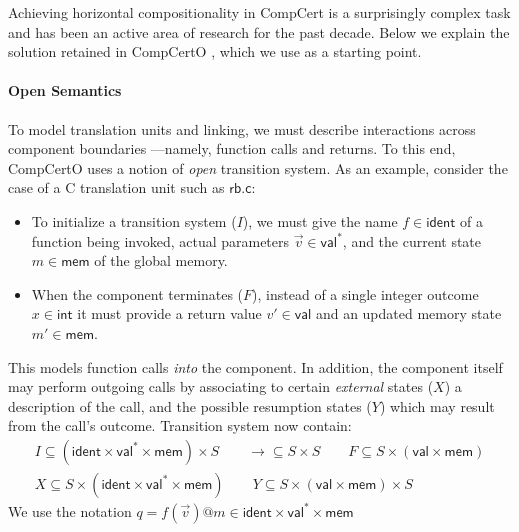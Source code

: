 \documentclass[acmsmall,screen,review,anonymous]{acmart}
\newcommand{\kw}[1]{\ensuremath{ \mathsf{#1} }}
\begin{document}
Achieving horizontal compositionality in CompCert
is a surprisingly complex task and
has been an active area of research for the past decade.
Below we explain the solution retained in CompCertO
\cite{compcerto},
which we use as a starting point.

\paragraph{Open Semantics} %

To model translation units and linking,
we must describe interactions across component boundaries%
---namely, function calls and returns.
To this end,
CompCertO
uses a notion of \emph{open} transition system.
As an example,
consider the case of a C translation unit such as \kw{rb.c}:
\begin{itemize}
\item
To initialize a transition system ($I$),
we must give the name $f \in \kw{ident}$
of a function being invoked,
actual parameters $\vec{v} \in \kw{val}^*$,
and the current state $m \in \kw{mem}$ of the global memory.
\item
When the component terminates ($F$),
instead of a single integer outcome $x \in \kw{int}$ it must provide
a return value $v' \in \kw{val}$ and an updated memory state $m' \in \kw{mem}$.
\end{itemize}
This models function calls \emph{into} the component.
In addition,
the component itself may
perform outgoing calls
by associating to certain \emph{external} states ($X$)
a description of the call,
and the possible resumption states ($Y$)
which may result from the call's outcome.
Transition system now contain:
\begin{equation}
 \begin{array}{c}
  I \subseteq (\kw{ident} \times \kw{val}^* \times \kw{mem}) \times S
  \qquad
  {\rightarrow} \subseteq S \times S
  \qquad
  F \subseteq S \times (\kw{val} \times \kw{mem})
  \\
  X \subseteq S \times (\kw{ident} \times \kw{val}^* \times \kw{mem})
  \qquad
  Y \subseteq S \times (\kw{val} \times \kw{mem}) \times S
 \end{array}
 \label{eqn:compcomp-lts}
\end{equation}
We use the notation $q = f(\vec{v})@m \in \kw{ident} \times \kw{val}^* \times \kw{mem}$
\end{document}
